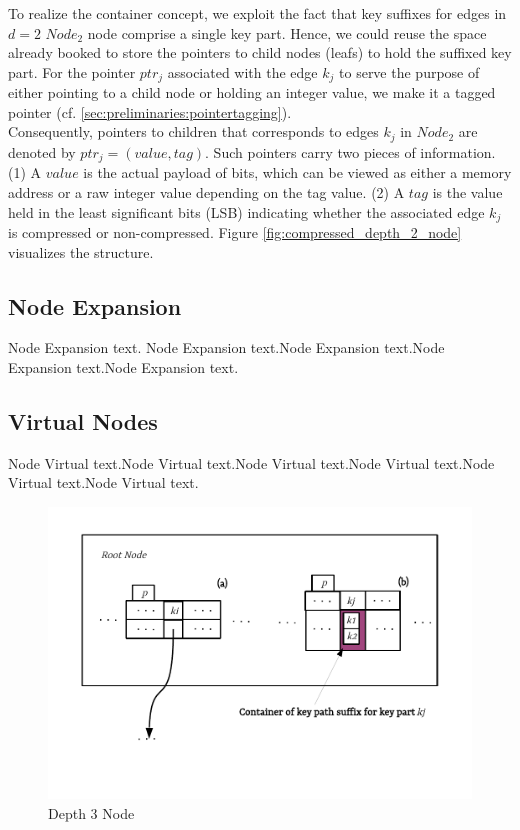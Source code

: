 To realize the container concept, we exploit the fact that key suffixes for edges in $d=2$ $Node_{2}$ node comprise a single key part.
Hence, we could reuse the space already booked to store the pointers to child nodes (leafs) to hold the suffixed key part.
For the pointer $ptr_{j}$ associated with the edge $k_{j}$ to serve the purpose of either pointing to a child node or holding an integer value, we make it a tagged pointer (cf. \ref{sec:preliminaries:pointertagging}). \\

Consequently, pointers to children that corresponds to edges $k_{j}$ in $Node_{2}$ are denoted by $ptr_{j} = (value, tag)$. Such pointers carry two pieces of information. (1) A $value$ is the actual payload of bits, which can be viewed as either a memory address or a raw integer value depending on the tag value. (2) A $tag$ is the value held in the least significant bits (LSB) indicating whether the associated edge $k_{j}$ is compressed or non-compressed. Figure \ref{fig:compressed_depth_2_node} visualizes the structure.

\subsection{Node Expansion}
Node Expansion text. Node Expansion text.Node Expansion text.Node Expansion text.Node Expansion text.

\subsection{Virtual Nodes}
Node Virtual text.Node Virtual text.Node Virtual text.Node Virtual text.Node Virtual text.Node Virtual text.

\begin{figure}
	\centering
	\vspace{-0.3in}
	\includegraphics{figures/chapter4/depth3}
	\caption{Depth 3 Node}
	\label{fig:compressed_depth_3_node}
\end{figure}



